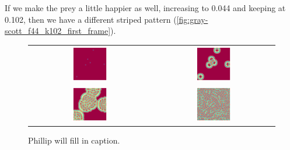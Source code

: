 If we make the prey a little happier as well, increasing   to 0.044 and keeping  at 0.102, then we have a different striped pattern (\autoref{fig:gray-scott_f44_k102_first_frame}).\\

\begin{figure}[h]
\centering
\mySfFamily
\begin{tabular}{c c}
\includegraphics[width = 0.3\textwidth]{../images/f044_k102_multi_Moment_1.jpg} & \includegraphics[width = 0.3\textwidth]{../images/f044_k102_multi_Moment_2.jpg} \\[2ex]
\includegraphics[width = 0.3\textwidth]{../images/f044_k102_multi_Moment_3.jpg} & \includegraphics[width = 0.3\textwidth]{../images/f044_k102_multi_Moment_4.jpg}
\end{tabular}
\caption{Phillip will fill in caption.}
\label{fig:gray-scott_f44_k102_first_frame}
\end{figure}

